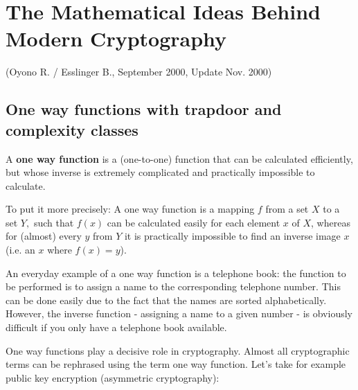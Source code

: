 

\setlength{\fboxrule}{.4pt}
\setlength{\fboxsep}{4pt}

\newpage
\section{The Mathematical Ideas Behind Modern Cryptography}
 (Oyono R. / Esslinger B., September 2000, Update Nov. 2000)
\subsection{One way functions with trapdoor and complexity classes}
  \hypertarget{OneWayFunktion1}{}
A {\bf one way function} is a (one-to-one) function that can be calculated 
efficiently, but whose inverse is extremely complicated and practically 
impossible to calculate.\par

To put it more precisely:  A one way function is a mapping $ f $ from a set $ X 
$ to a set $ Y, $ such that $ f(x) $ can be calculated easily for each element $ 
x $ of $ X $, whereas for (almost) every $ y $ from $ Y $  it is practically 
impossible to find an inverse image $ x $ (i.e. an $ x $ where $ f(x)=y $).\par

An everyday example of a one way function is a telephone book: the function to 
be performed is to assign a name to the corresponding telephone number. This can 
be done easily due to the fact that the names are sorted alphabetically. 
However, the inverse function - assigning a name to a given number - is 
obviously difficult if you only have a telephone book available. \par

One way functions play a decisive role in cryptography. Almost all cryptographic 
terms can be rephrased using the term one way function. Let's take for example 
public key encryption  
(asymmetric cryptography):\par


